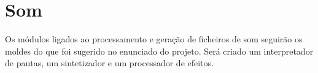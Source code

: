 \chapter{Som}
\label{chap.som}

Os módulos ligados ao processamento e geração de ficheiros de som seguirão os moldes do que foi sugerido no enunciado do projeto. Será criado um interpretador de pautas, um sintetizador e um processador de efeitos.